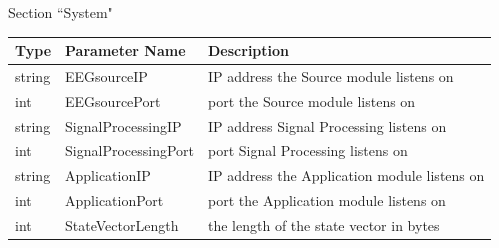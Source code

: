 \documentclass[letterpaper,oneside,12pt]{book}
\begin{document}
\begin{flushleft}


\vspace{.5cm}
\large Section ``System" \normalsize \\[1ex]

 \begin{tabular}{|l|l|l|}
  \hline
  \textbf{Type} & \textbf{Parameter Name} & \textbf{Description}\\
  \hline
  string & EEGsourceIP & IP address the Source module listens on\\  
  \hline
  int & EEGsourcePort & port the Source module listens on\\  
  \hline
  string & SignalProcessingIP & IP address Signal Processing listens on\\  
  \hline
  int & SignalProcessingPort & port Signal Processing listens on\\  
  \hline
  string & ApplicationIP & IP address the Application module listens on\\  
  \hline
  int & ApplicationPort & port the Application module listens on\\  
  \hline
  int & StateVectorLength & the length of the state vector in bytes\\  
  \hline
 \end{tabular}

\end{flushleft}
\end{document}
